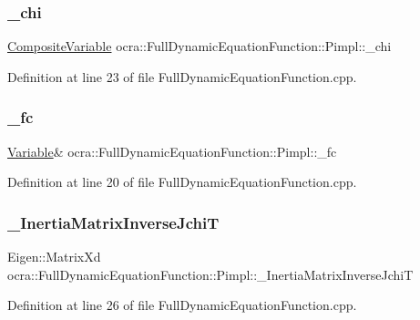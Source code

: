 \subsubsection{\texorpdfstring{\+\_\+chi}{\_chi}}
{\footnotesize\ttfamily \hyperlink{classocra_1_1CompositeVariable}{Composite\+Variable} ocra\+::\+Full\+Dynamic\+Equation\+Function\+::\+Pimpl\+::\+\_\+chi}



Definition at line 23 of file Full\+Dynamic\+Equation\+Function.\+cpp.

\hypertarget{structFullDynamicEquationFunction_1_1Pimpl_ab19caa3b14b35bba6a5dc5ea490cb7b4}{}\label{structFullDynamicEquationFunction_1_1Pimpl_ab19caa3b14b35bba6a5dc5ea490cb7b4} 
\subsubsection{\texorpdfstring{\+\_\+fc}{\_fc}}
{\footnotesize\ttfamily \hyperlink{classocra_1_1Variable}{Variable}\& ocra\+::\+Full\+Dynamic\+Equation\+Function\+::\+Pimpl\+::\+\_\+fc}



Definition at line 20 of file Full\+Dynamic\+Equation\+Function.\+cpp.

\hypertarget{structFullDynamicEquationFunction_1_1Pimpl_a66a532ac843e6bb0255918262e48a947}{}\label{structFullDynamicEquationFunction_1_1Pimpl_a66a532ac843e6bb0255918262e48a947} 
\subsubsection{\texorpdfstring{\+\_\+\+Inertia\+Matrix\+Inverse\+JchiT}{\_InertiaMatrixInverseJchiT}}
{\footnotesize\ttfamily Eigen\+::\+Matrix\+Xd ocra\+::\+Full\+Dynamic\+Equation\+Function\+::\+Pimpl\+::\+\_\+\+Inertia\+Matrix\+Inverse\+JchiT}



Definition at line 26 of file Full\+Dynamic\+Equation\+Function.\+cpp.

